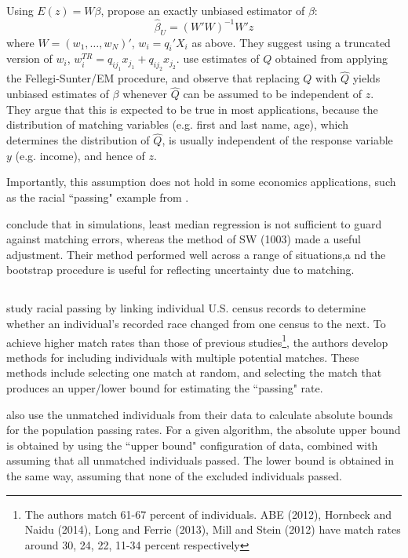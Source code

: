 \documentclass[12pt]{article}
\begin{document}
Using $E(z) = W\beta$, \cite{lahiri05} propose an exactly unbiased estimator of $\beta$:
$$ \hat{\beta}_U = (W'W)^{-1} W'z$$ 
where $W = (w_1, \dots, w_N)'$, $w_i = q_i'X_i$ as above.  They suggest using a truncated version of $w_i$, $w_i^{TR} = q_{ij_1} x_{j_1} + q_{ij_2} x_{j_2}$.   \cite{lahiri05} use estimates of $Q$ obtained from applying the Fellegi-Sunter/EM procedure, and observe that replacing $Q$ with $\hat{Q}$ yields unbiased estimates of $\beta$ whenever $\hat{Q}$ can be assumed to be independent of $z$.  They argue that this is expected to be true in most applications, because the distribution of matching variables (e.g. first and last name, age), which determines the distribution of $\hat{Q}$, is usually independent of the response variable $y$ (e.g. income), and hence of $z$.  

Importantly, this assumption does not hold in some economics applications, such as the racial ``passing" example from \cite{nq2015}. 

\cite{lahiri05} conclude that in simulations, least median regression is not sufficient to guard against matching errors, whereas the method of SW (1003) made a useful adjustment.  Their method performed well across a range of situations,a nd the bootstrap procedure is useful for reflecting uncertainty due to matching.  

\subsection{\cite{nq2015}}


\cite{nq2015} study racial passing by linking individual U.S. census records to determine whether an individual's recorded race changed from one census to the next.  To achieve higher match rates than those of previous studies\footnote{The authors match 61-67 percent of individuals.   ABE (2012), Hornbeck and Naidu (2014), Long and Ferrie (2013), Mill and Stein (2012)
have match rates around 30, 24, 22, 11-34 percent respectively}, the authors develop methods for including individuals with multiple potential matches.  These methods include selecting one match at random, and selecting the match that produces an upper/lower bound for estimating the ``passing" rate.  

\cite{nq2015} also use the unmatched individuals from their data to calculate absolute bounds for the population passing rates.  For a given algorithm, the absolute upper bound is obtained by using the ``upper bound" configuration of data, combined with assuming that all unmatched individuals passed.  The lower bound is obtained in the same way, assuming that none of the excluded individuals passed. 
\end{document}
